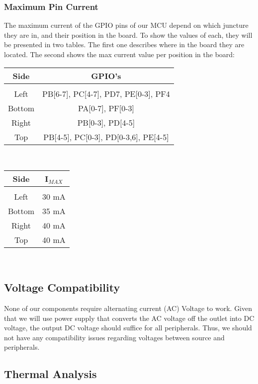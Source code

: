 		\subsubsection{Maximum Pin Current}

			The maximum current of the GPIO pins of our MCU depend on which juncture they are in, and their position in the board. To show the values of each, they will be presented in two tables. The first one describes where in the board they are located. The second shows the max current value per position in the board: \\

			\begin{tabular}{|c|c|}
			\hline
			 Side & GPIO's \\
			\hline
			&    \\
			Left & PB[6-7], PC[4-7], PD7, PE[0-3], PF4 \\
			Bottom & PA[0-7], PF[0-3] \\
			Right & PB[0-3], PD[4-5] \\
			Top & PB[4-5], PC[0-3], PD[0-3,6], PE[4-5] \\

			\hline
			\end{tabular} \\ 

			\begin{tabular}{|c|c|}
			\hline
			 Side & I$_{MAX}$ \\
			\hline
			&    \\
			Left & 30 mA \\
			Bottom & 35 mA \\
			Right & 40 mA \\
			Top & 40 mA \\

			\hline
			\end{tabular} \\ 	 

	\subsection{Voltage Compatibility}

		None of our components require alternating current (AC) Voltage to work. Given that we will use power supply that converts the AC voltage off the outlet into DC voltage, the output DC voltage should suffice for all peripherals. Thus, we should not have any compatibility issues regarding voltages between source and peripherals. 

	\subsection{Thermal Analysis}

